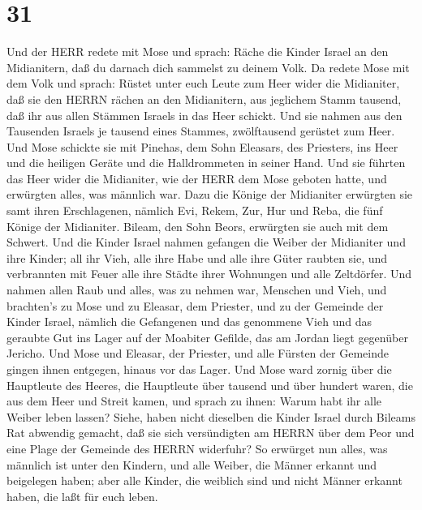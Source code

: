 \hypertarget{section-30}{%
\section{31}\label{section-30}}

 Und der HERR redete mit Mose und sprach:  Räche
die Kinder Israel an den Midianitern, daß du darnach dich sammelst zu
deinem Volk.  Da redete Mose mit dem Volk und sprach: Rüstet
unter euch Leute zum Heer wider die Midianiter, daß sie den HERRN rächen
an den Midianitern,  aus jeglichem Stamm tausend, daß ihr
aus allen Stämmen Israels in das Heer schickt.  Und sie
nahmen aus den Tausenden Israels je tausend eines Stammes, zwölftausend
gerüstet zum Heer.  Und Mose schickte sie mit Pinehas, dem
Sohn Eleasars, des Priesters, ins Heer und die heiligen Geräte und die
Halldrommeten in seiner Hand.  Und sie führten das Heer
wider die Midianiter, wie der HERR dem Mose geboten hatte, und erwürgten
alles, was männlich war.  Dazu die Könige der Midianiter
erwürgten sie samt ihren Erschlagenen, nämlich Evi, Rekem, Zur, Hur und
Reba, die fünf Könige der Midianiter. Bileam, den Sohn Beors, erwürgten
sie auch mit dem Schwert.  Und die Kinder Israel nahmen
gefangen die Weiber der Midianiter und ihre Kinder; all ihr Vieh, alle
ihre Habe und alle ihre Güter raubten sie,  und verbrannten
mit Feuer alle ihre Städte ihrer Wohnungen und alle Zeltdörfer.
 Und nahmen allen Raub und alles, was zu nehmen war,
Menschen und Vieh,  und brachten's zu Mose und zu Eleasar,
dem Priester, und zu der Gemeinde der Kinder Israel, nämlich die
Gefangenen und das genommene Vieh und das geraubte Gut ins Lager auf der
Moabiter Gefilde, das am Jordan liegt gegenüber Jericho. 
Und Mose und Eleasar, der Priester, und alle Fürsten der Gemeinde gingen
ihnen entgegen, hinaus vor das Lager.  Und Mose ward zornig
über die Hauptleute des Heeres, die Hauptleute über tausend und über
hundert waren, die aus dem Heer und Streit kamen,  und
sprach zu ihnen: Warum habt ihr alle Weiber leben lassen? 
Siehe, haben nicht dieselben die Kinder Israel durch Bileams Rat
abwendig gemacht, daß sie sich versündigten am HERRN über dem Peor und
eine Plage der Gemeinde des HERRN widerfuhr?  So erwürget
nun alles, was männlich ist unter den Kindern, und alle Weiber, die
Männer erkannt und beigelegen haben;  aber alle Kinder, die
weiblich sind und nicht Männer erkannt haben, die laßt für euch leben.
